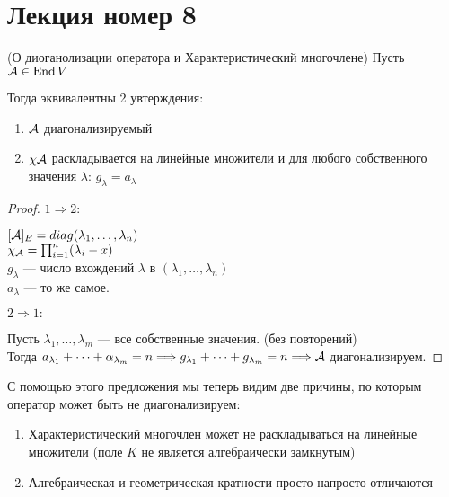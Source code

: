 \section{Лекция номер 8}

\begin{theorem}(О диоганолизации оператора и Характеристический многочлене)
    Пусть $\mathcal{A} \in \operatorname{End}{V}$

    Тогда эквивалентны 2 увтерждения:
    \begin{enumerate}
        \item $\mathcal{A}$ диагонализируемый
        \item $\chi{\mathcal{A}}$ раскладывается на линейные множители
        и для любого собственного значения $\lambda: \, g_{\lambda} = a_{\lambda}$
    \end{enumerate}

    \begin{proof} \quad

    \quad$1 \Longrightarrow 2: $

    $[\mathcal{A}]_{E} = diag (\lambda_1, \dots, \lambda_n)$ \\
    $\chi_{\mathcal{A}} = \prod_{i = 1}^{n} (\lambda_i - x)$ \\
    $g_{\lambda}$ --- число вхождений $\lambda$ в $(\lambda_1, \dots, \lambda_n)$ \\
    $a_{\lambda}$ --- то же самое.

    \quad$2 \Longrightarrow 1: $
    
    Пусть $\lambda_1, \dots, \lambda_m$ --- все собственные значения. (без повторений) \\
    Тогда $a_{\lambda_1} + \dots + \alpha_{\lambda_m} = n \Longrightarrow g_{\lambda_1} + \dots + g_{\lambda_m} = n \Longrightarrow \mathcal{A}$ диагонализируем.

    \end{proof}
\end{theorem}

\vspace*{5mm}

С помощью этого предложения мы теперь видим две причины, по которым оператор может быть не диагонализируем:
\begin{enumerate}
    \item Характеристический многочлен может не раскладываться на линейные множители (поле $K$ не является алгебраически замкнутым)
    \item Алгебраическая и геометрическая кратности просто напросто отличаются
\end{enumerate}

